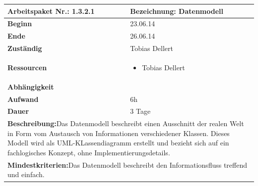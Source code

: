 \documentclass[fontsize=12pt,paper=a4,twoside]{scrartcl}
\begin{document}
\begin{verbatim} 
\end{verbatim}

\begin{tabular}{|p{5.3cm}|p{9.7cm}|}\hline
	\textbf{Arbeitspaket Nr.:} 1.3.2.1 & \textbf{Bezeichnung:} Datenmodell\\ \hline \hline
	\textbf{Beginn} & 23.06.14\\ \hline
	\textbf{Ende} & 26.06.14\\ \hline
	\textbf{Zuständig} & Tobias Dellert\\ \hline
	\textbf{Ressourcen} & \begin{itemize}
		\item Tobias Dellert
	\end{itemize}    \\ \hline
	\textbf{Abhängigkeit} &\\ \hline
	\textbf{Aufwand}  &  6h\\ \hline
	\textbf{Dauer} & 3 Tage\\ \hline
	\multicolumn{2}{|p{15cm}|}{\textbf{Beschreibung:}\newline Das Datenmodell beschreibt einen Ausschnitt der realen Welt in Form vom Austausch von Informationen verschiedener Klassen. Dieses Modell wird als UML-KLassendiagramm erstellt und bezieht sich auf ein fachlogisches Konzept, ohne Implementierungsdetails. }\\ \hline
	\multicolumn{2}{|p{15cm}|}{\textbf{Mindestkriterien:}\newline Das Datenmodell beschreibt den Informationsfluss treffend und einfach. }\\ \hline
\end{tabular}

\begin{verbatim} 
\end{verbatim}
\end{document}
